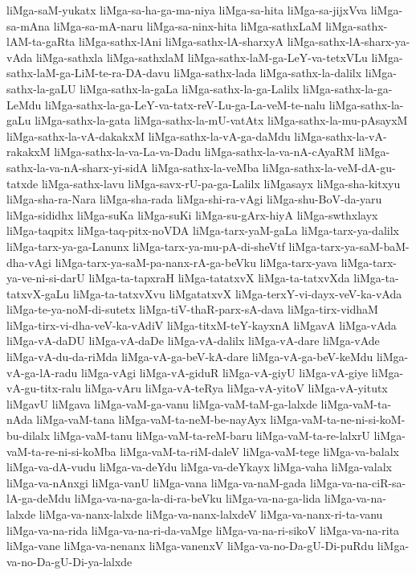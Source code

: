 {liMga-saM-yukatx
liMga-sa-ha-ga-ma-niya
liMga-sa-hita
liMga-sa-jijxVva
liMga-sa-mAna
liMga-sa-mA-naru
liMga-sa-ninx-hita
liMga-sathxLaM
liMga-sathx-lAM-ta-gaRta
liMga-sathx-lAni
liMga-sathx-lA-sharxyA
liMga-sathx-lA-sharx-ya-vAda
liMga-sathxla
liMga-sathxlaM
liMga-sathx-laM-ga-LeY-va-tetxVLu
liMga-sathx-laM-ga-LiM-te-ra-DA-davu
liMga-sathx-lada
liMga-sathx-la-dalilx
liMga-sathx-la-gaLU
liMga-sathx-la-gaLa
liMga-sathx-la-ga-Lalilx
liMga-sathx-la-ga-LeMdu
liMga-sathx-la-ga-LeY-va-tatx-reV-Lu-ga-La-veM-te-nalu
liMga-sathx-la-gaLu
liMga-sathx-la-gata
liMga-sathx-la-mU-vatAtx
liMga-sathx-la-mu-pAsayxM
liMga-sathx-la-vA-dakakxM
liMga-sathx-la-vA-ga-daMdu
liMga-sathx-la-vA-rakakxM
liMga-sathx-la-va-La-va-Dadu
liMga-sathx-la-va-nA-cAyaRM
liMga-sathx-la-va-nA-sharx-yi-sidA
liMga-sathx-la-veMba
liMga-sathx-la-veM-dA-gu-tatxde
liMga-sathx-lavu
liMga-savx-rU-pa-ga-Lalilx
liMgasayx
liMga-sha-kitxyu
liMga-sha-ra-Nara
liMga-sha-rada
liMga-shi-ra-vAgi
liMga-shu-BoV-da-yaru
liMga-sididhx
liMga-suKa
liMga-suKi
liMga-su-gArx-hiyA
liMga-swthxlayx
liMga-taqpitx
liMga-taq-pitx-noVDA
liMga-tarx-yaM-gaLa
liMga-tarx-ya-dalilx
liMga-tarx-ya-ga-Lanunx
liMga-tarx-ya-mu-pA-di-sheVtf
liMga-tarx-ya-saM-baM-dha-vAgi
liMga-tarx-ya-saM-pa-nanx-rA-ga-beVku
liMga-tarx-yava
liMga-tarx-ya-ve-ni-si-darU
liMga-ta-tapxraH
liMga-tatatxvX
liMga-ta-tatxvXda
liMga-ta-tatxvX-gaLu
liMga-ta-tatxvXvu
liMgatatxvX
liMga-terxY-vi-dayx-veV-ka-vAda
liMga-te-ya-noM-di-sutetx
liMga-tiV-thaR-parx-sA-dava
liMga-tirx-vidhaM
liMga-tirx-vi-dha-veV-ka-vAdiV
liMga-titxM-teY-kayxnA
liMgavA
liMga-vAda
liMga-vA-daDU
liMga-vA-daDe
liMga-vA-dalilx
liMga-vA-dare
liMga-vAde
liMga-vA-du-da-riMda
liMga-vA-ga-beV-kA-dare
liMga-vA-ga-beV-keMdu
liMga-vA-ga-lA-radu
liMga-vAgi
liMga-vA-giduR
liMga-vA-giyU
liMga-vA-giye
liMga-vA-gu-titx-ralu
liMga-vAru
liMga-vA-teRya
liMga-vA-yitoV
liMga-vA-yitutx
liMgavU
liMgava
liMga-vaM-ga-vanu
liMga-vaM-taM-ga-lalxde
liMga-vaM-ta-nAda
liMga-vaM-tana
liMga-vaM-ta-neM-be-nayAyx
liMga-vaM-ta-ne-ni-si-koM-bu-dilalx
liMga-vaM-tanu
liMga-vaM-ta-reM-baru
liMga-vaM-ta-re-lalxrU
liMga-vaM-ta-re-ni-si-koMba
liMga-vaM-ta-riM-daleV
liMga-vaM-tege
liMga-va-balalx
liMga-va-dA-vudu
liMga-va-deYdu
liMga-va-deYkayx
liMga-vaha
liMga-valalx
liMga-va-nAnxgi
liMga-vanU
liMga-vana
liMga-va-naM-gada
liMga-va-na-ciR-sa-lA-ga-deMdu
liMga-va-na-ga-la-di-ra-beVku
liMga-va-na-ga-lida
liMga-va-na-lalxde
liMga-va-nanx-lalxde
liMga-va-nanx-lalxdeV
liMga-va-nanx-ri-ta-vanu
liMga-va-na-rida
liMga-va-na-ri-da-vaMge
liMga-va-na-ri-sikoV
liMga-va-na-rita
liMga-vane
liMga-va-nenanx
liMga-vanenxV
liMga-va-no-Da-gU-Di-puRdu
liMga-va-no-Da-gU-Di-ya-lalxde
}
